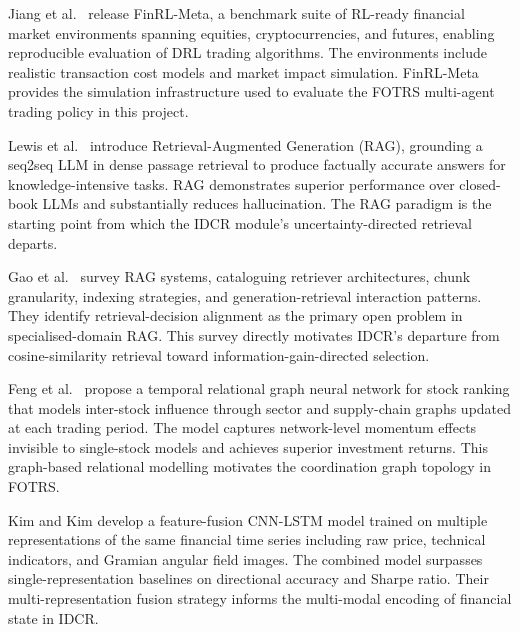 \documentclass[12pt,a4paper,oneside]{report}
\theoremstyle{definition}
\theoremstyle{remark}
\begin{document}
\medskip

\noindent Jiang et al.\ \cite{Jiang2022FinRLMeta} release FinRL-Meta, a benchmark suite of RL-ready financial market environments spanning equities, cryptocurrencies, and futures, enabling reproducible evaluation of DRL trading algorithms. The environments include realistic transaction cost models and market impact simulation. FinRL-Meta provides the simulation infrastructure used to evaluate the FOTRS multi-agent trading policy in this project.

\noindent Lewis et al.\ \cite{Lewis2020RAG} introduce Retrieval-Augmented Generation (RAG), grounding a seq2seq LLM in dense passage retrieval to produce factually accurate answers for knowledge-intensive tasks. RAG demonstrates superior performance over closed-book LLMs and substantially reduces hallucination. The RAG paradigm is the starting point from which the IDCR module's uncertainty-directed retrieval departs.

\medskip

\noindent Gao et al.\ \cite{Gao2023RAGSurvey} survey RAG systems, cataloguing retriever architectures, chunk granularity, indexing strategies, and generation-retrieval interaction patterns. They identify retrieval-decision alignment as the primary open problem in specialised-domain RAG. This survey directly motivates IDCR's departure from cosine-similarity retrieval toward information-gain-directed selection.

\medskip

\noindent Feng et al.\ \cite{Feng2022TemporalRelational} propose a temporal relational graph neural network for stock ranking that models inter-stock influence through sector and supply-chain graphs updated at each trading period. The model captures network-level momentum effects invisible to single-stock models and achieves superior investment returns. This graph-based relational modelling motivates the coordination graph topology in FOTRS.

\medskip

\noindent Kim and Kim \cite{Kim2019CNNLSTMFinance} develop a feature-fusion CNN-LSTM model trained on multiple representations of the same financial time series including raw price, technical indicators, and Gramian angular field images. The combined model surpasses single-representation baselines on directional accuracy and Sharpe ratio. Their multi-representation fusion strategy informs the multi-modal encoding of financial state in IDCR.

\medskip
\end{document}

